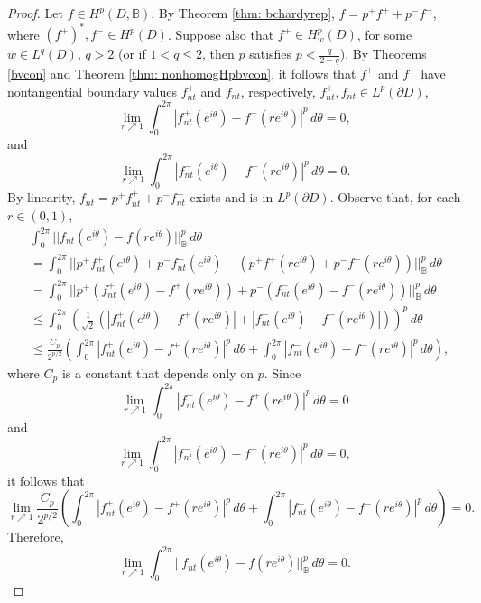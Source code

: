 \documentclass[suppldata]{interact}
\theoremstyle{plain}%
\theoremstyle{definition}
\theoremstyle{remark}
\newcommand{\p}{\partial}
\newcommand{\bc}{\mathbb{B}}
\newcommand{\hpb}{H^p(D,\bc)}
\begin{document}
\begin{proof}
Let $f \in \hpb$. By Theorem \ref{thm: bchardyrep}, $f = p^+f^+ + p^- f^-$, where $(f^+)^*,f^- \in H^p(D)$. Suppose also that $f^+ \in H^p_w(D)$, for some $w \in L^q(D)$, $q>2$ (or if $1 < q \leq 2$, then $p$ satisfies $p < \frac{q}{2-q}$). By Theorems \ref{bvcon} and Theorem \ref{thm: nonhomogHpbvcon}, it follows that $f^+$ and $f^-$ have nontangential boundary values $f^+_{nt}$ and $f^-_{nt}$, respectively, $f^+_{nt}, f^-_{nt} \in L^p(\p D)$, 
\[
\lim_{r \nearrow 1} \int_0^{2\pi} |f^+_{nt}(e^{i\theta}) - f^+(re^{i\theta}) |^p \, d\theta  = 0,
\]
and 
\[
\lim_{r \nearrow 1} \int_0^{2\pi} |f^-_{nt}(e^{i\theta}) - f^-(re^{i\theta}) |^p \, d\theta  = 0.
\]
By linearity, $f_{nt} = p^+ f^+_{nt} + p^- f^-_{nt}$ exists and is in $L^p(\p D)$. Observe that, for each $r \in (0,1)$, 
\begin{align*}
&\int_0^{2\pi} ||f_{nt}(e^{i\theta}) - f(re^{i\theta}) ||^p_{\bc} \, d\theta \\
&= \int_0^{2\pi} ||p^+ f^+_{nt}(e^{i\theta}) + p^- f^-_{nt}(e^{i\theta}) - (p^+ f^+(re^{i\theta}) + p^- f^-(re^{i\theta})) ||^p_{\bc} \, d\theta \\
&= \int_0^{2\pi} ||p^+ (f^+_{nt}(e^{i\theta})-f^+(re^{i\theta})) + p^- (f^-_{nt}(e^{i\theta}) - f^-(re^{i\theta})) ||^p_{\bc} \, d\theta \\
&\leq \int_0^{2\pi} \left(\frac{1}{\sqrt{2}}(|f^+_{nt}(e^{i\theta})-f^+(re^{i\theta})| + |f^-_{nt}(e^{i\theta}) - f^-(re^{i\theta}) |)\right)^p \, d\theta \\
&\leq \frac{C_p}{2^{p/2}}\left(\int_0^{2\pi} |f^+_{nt}(e^{i\theta})-f^+(re^{i\theta})|^p \,d\theta + \int_0^{2\pi} |f^-_{nt}(e^{i\theta}) - f^-(re^{i\theta}) |^p \, d\theta \right), 
\end{align*}
where $C_p$ is a constant that depends only on $p$. Since 
\[
\lim_{r \nearrow 1} \int_0^{2\pi} |f^+_{nt}(e^{i\theta}) - f^+(re^{i\theta}) |^p \, d\theta  = 0
\]
and 
\[
\lim_{r \nearrow 1} \int_0^{2\pi} |f^-_{nt}(e^{i\theta}) - f^-(re^{i\theta}) |^p \, d\theta  = 0,
\]
it follows that 
\[
\lim_{r \nearrow 1}\frac{C_p}{2^{p/2}}\left(\int_0^{2\pi} |f^+_{nt}(e^{i\theta})-f^+(re^{i\theta})|^p \,d\theta + \int_0^{2\pi} |f^-_{nt}(e^{i\theta}) - f^-(re^{i\theta}) |^p \, d\theta \right) = 0.
\]
Therefore, 
\[
\lim_{r \nearrow 1} \int_0^{2\pi} ||f_{nt}(e^{i\theta}) - f(re^{i\theta}) ||^p_{\bc} \, d\theta = 0.
\]

\end{proof}
\end{document}
